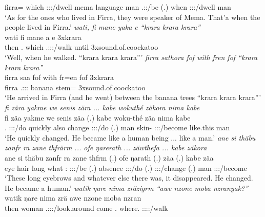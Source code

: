 \begin{exe}
	firra={\Loc} which \Stpl:\Sbj:\Pst:\Dur/dwell mema language man \Tsg.\Masc:\Pst:\Ipfv/be (.) when \Stpl:\Sbj:\Pst:\Dur/dwell man\\
	\trans `As for the ones who lived in Firra, they were speaker of Mema. That'a when the people lived in Firra.'
	\emph{wati, fi mane yaka e ``krara krara krara''}\\
	\gll wati fi mane a e 3x{krara}\\
	then \Third.{\Abs} which \Tsg.\Masc:\Sbj:\Pst:\Ipfv/walk until 3x{sound.of.coockatoo}\\
	\trans `Well, when he walked. ``krara krara krara'''
	\emph{firra sathora fof with fren fof ``krara krara krara''}\\
	\gll firra saa fof with fr=en fof 3x{krara}\\
	firra \Tsg.\Masc:\Sbj:\Pst:\Pfv {\Emph} banana stem={\Loc} {\Emph} 3x{sound.of.coockatoo}\\
	\trans `He arrived in Firra (and he went) between the banana trees ``krara krara krara'''
	\emph{fi zära yakme we senis zära ... kabe wokuthé zäkora nima kabe}\\
	\gll fi zäa yakme we senis zäa (.) kabe woku-thé zäa nima kabe\\
	\Third.{\Abs} \Stsg:\Sbj:\Pst:\Pfv/do quickly also change \Stsg:\Sbj:\Pst:\Pfv/do (.) man skin-{\Adlzr} \Stsg:\Sbj:\Pst:\Pfv/become {like.this} man\\
	\trans `He quickly changed. He became like a human being ... like a man.'
	\emph{ane si thäbu zanfr ra zane thfrärm ... ofe ŋarerath ... zäwthefa ... kabe zäkora}\\
	\gll ane si thäbu zanfr ra zane thfrm (.) ofe ŋarath (.) zäa (.) kabe zäa\\
	{\Dem} eye hair long what \Dem:{\Prox} \Stpl:\Sbj:\Pst:\Dur/be (.) absence \Stpl:\Sbj:\Pst:\Ipfv/do (.) \Stsg:\Sbj:\Pst:\Pfv/change (.) man \Stsg:\Sbj:\Pst:\Pfv/become\\
	\trans `These long eyebrows and whatever else there was, it disappeared. He changed. He became a human.'
	\emph{watik ŋare nima zräzigrm ``awe nzone moba nzranyak?''}\\
	\gll watik ŋare nima zrä awe nzone moba nzran\\
	then woman {\Quot} \Tsg.\F:\Sbj:\Irr:\Pfv/look.around come \Fsg.{\Poss} where.{\Abl} \Ssg:\Sbj:\Irr:\Ipfv:\Venit/walk\\\

\end{exe}
